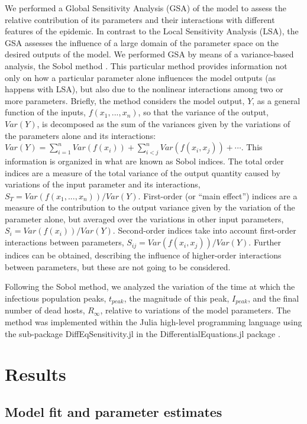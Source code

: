 We performed a Global Sensitivity Analysis (GSA)
\cite{Sensitivity_analysis_book} of the model to assess the relative
contribution of its parameters and their interactions with different features
of the epidemic. In contrast to the Local Sensitivity Analysis (LSA), the GSA
assesses the influence of a large domain of the parameter space on the desired
outputs of the model. We performed GSA by means of a variance-based analysis,
the Sobol method \cite{SOBOL2001271}. This particular method provides
information not only on how a particular parameter alone influences the model
outputs (as happens with LSA), but also due to the nonlinear interactions among
two or more parameters. Briefly, the method considers the model output, $Y$, as
a general function of the inputs, $f(x_1, ..., x_n)$, so that the variance of
the output, $Var(Y)$, is decomposed as the sum of the variances given by the
variations of the parameters alone and its interactions:
$Var(Y)=\sum_{i=1}^nVar(f(x_i)) + \sum_{i<j}^nVar(f(x_i, x_j)) + \cdots$. This
information is organized in what are known as Sobol indices. The total order
indices are a measure of the total variance of the output quantity caused by
variations of the input parameter and its interactions,
$S_T=Var(f(x_1,...,x_n))/Var(Y)$. First-order (or ``main effect'') indices are
a measure of the contribution to the output variance given by the variation of
the parameter alone, but averaged over the variations in other input
parameters, $S_i=Var(f(x_i))/Var(Y)$. Second-order indices take into account
first-order interactions between parameters, $S_{ij}=Var(f(x_i,x_j)) / Var(Y)$.
Further indices can be obtained, describing the influence of higher-order
interactions between parameters, but these are not going to be considered.

Following the Sobol method, we analyzed the variation of the time at which
the infectious population peaks, $t_{peak}$, the magnitude of this peak,
$I_{peak}$, and the final number of dead hosts, $R_{\infty}$, relative to
variations of the model parameters. The method was implemented within the Julia
high-level programming language \cite{julia} using the sub-package
DiffEqSensitivity.jl in the DifferentialEquations.jl package
\cite{DifferentialEquations.jl}.

\newpage
\section{Results}

\subsection{Model fit and parameter estimates}


